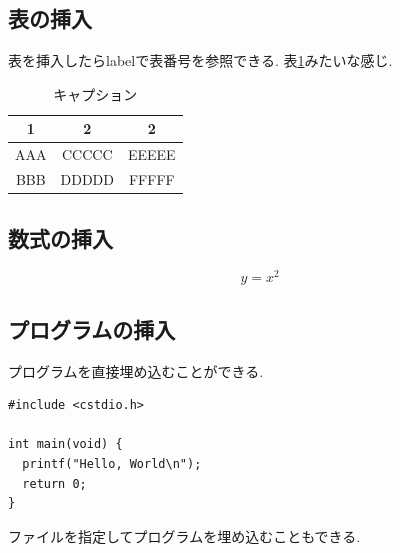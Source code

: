 \documentclass[a4paper]{jarticle}
\begin{document}
\subsection{表の挿入}

表を挿入したらlabelで表番号を参照できる.
表\ref{table1}みたいな感じ.

\begin{table}[htb]
  \centering
    \caption{キャプション}
    \label{table1}
    \begin{tabular}{c|c|c}
      \hline
      1 & 2 & 2 \\
      \hline \hline
      AAA & CCCCC & EEEEE \\
      BBB & DDDDD & FFFFF \\
      \hline
    \end{tabular}
\end{table}

\subsection{数式の挿入}

\begin{equation}
  y = x^2
\end{equation}

\subsection{プログラムの挿入}

プログラムを直接埋め込むことができる.

\begin{lstlisting}
#include <cstdio.h>

int main(void) {
  printf("Hello, World\n");
  return 0;
}
\end{lstlisting}

ファイルを指定してプログラムを埋め込むこともできる.


\end{document}
